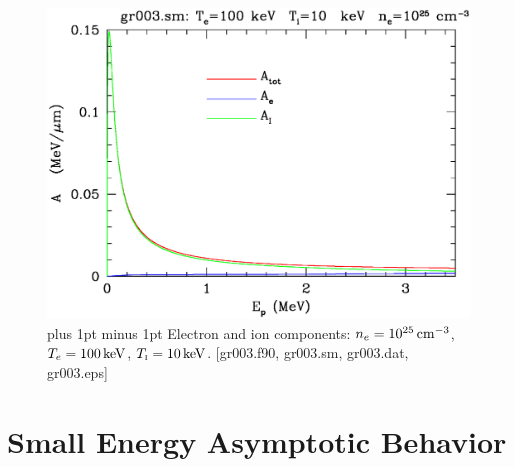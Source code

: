 \documentclass[preprint,12pt,eqsecnum,nofootinbib,amsmath,amssymb]{revtex4}
\newcommand{\smI}{{\rm\scriptscriptstyle I}}
\newcommand{\footnoteskip}{\baselineskip 12pt plus 1pt minus 1pt}
\begin{document}
\vskip-2cm 
\begin{figure}[h!]
\includegraphics[scale=0.45]{gr003.eps} 
\vskip-0.8cm 
\caption{\footnoteskip  
  Electron and ion components: $n_e=10^{25}\,{\rm cm^{-3}}$,
  $T_e=100\,{\rm keV}$, $T_\smI=10\,{\rm keV}$. [gr003.f90, gr003.sm,
  gr003.dat, gr003.eps]
}
\label{fig:gr003}
\end{figure}

\pagebreak
\clearpage
\section{Small Energy Asymptotic Behavior}
\end{document}
